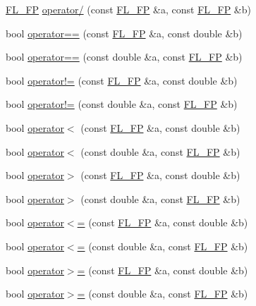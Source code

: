 \begin{DoxyCompactItemize}
\item 
\hyperlink{class_f_l___f_p}{F\+L\+\_\+\+FP} \hyperlink{class_f_l___f_p_a746b7c97a3194b33df5e6e04ce0ce5e8}{operator/} (const \hyperlink{class_f_l___f_p}{F\+L\+\_\+\+FP} \&a, const \hyperlink{class_f_l___f_p}{F\+L\+\_\+\+FP} \&b)
\item 
bool \hyperlink{class_f_l___f_p_a666442f1b900ba2e6680d77ec4261a9e}{operator==} (const \hyperlink{class_f_l___f_p}{F\+L\+\_\+\+FP} \&a, const double \&b)
\item 
bool \hyperlink{class_f_l___f_p_a8b8fd18407f83f9bbf63012179eb694d}{operator==} (const double \&a, const \hyperlink{class_f_l___f_p}{F\+L\+\_\+\+FP} \&b)
\item 
bool \hyperlink{class_f_l___f_p_a3c240fef687da52fed8f3646a924d91e}{operator!=} (const \hyperlink{class_f_l___f_p}{F\+L\+\_\+\+FP} \&a, const double \&b)
\item 
bool \hyperlink{class_f_l___f_p_a699d74159c9061491364140ac24a568b}{operator!=} (const double \&a, const \hyperlink{class_f_l___f_p}{F\+L\+\_\+\+FP} \&b)
\item 
bool \hyperlink{class_f_l___f_p_ae0d89fcb254db9759b80cca31de5ee00}{operator$<$} (const \hyperlink{class_f_l___f_p}{F\+L\+\_\+\+FP} \&a, const double \&b)
\item 
bool \hyperlink{class_f_l___f_p_af1a4354ad8a5d501c5d9f3a784ca3b95}{operator$<$} (const double \&a, const \hyperlink{class_f_l___f_p}{F\+L\+\_\+\+FP} \&b)
\item 
bool \hyperlink{class_f_l___f_p_acc2241533b3b7f53f6e8bc40c77233a5}{operator$>$} (const \hyperlink{class_f_l___f_p}{F\+L\+\_\+\+FP} \&a, const double \&b)
\item 
bool \hyperlink{class_f_l___f_p_aed84a1784274a020d95f2c01746f2b5c}{operator$>$} (const double \&a, const \hyperlink{class_f_l___f_p}{F\+L\+\_\+\+FP} \&b)
\item 
bool \hyperlink{class_f_l___f_p_a2453dc97f7fd85f4a1c07f5d888c4b87}{operator$<$=} (const \hyperlink{class_f_l___f_p}{F\+L\+\_\+\+FP} \&a, const double \&b)
\item 
bool \hyperlink{class_f_l___f_p_a78d1e2f69d82635ea82a2b717d79d5bb}{operator$<$=} (const double \&a, const \hyperlink{class_f_l___f_p}{F\+L\+\_\+\+FP} \&b)
\item 
bool \hyperlink{class_f_l___f_p_ace9ff2ae86cfecb59b601ef983b5189d}{operator$>$=} (const \hyperlink{class_f_l___f_p}{F\+L\+\_\+\+FP} \&a, const double \&b)
\item 
bool \hyperlink{class_f_l___f_p_a1f7bf9f00e36c130033949619f5261dd}{operator$>$=} (const double \&a, const \hyperlink{class_f_l___f_p}{F\+L\+\_\+\+FP} \&b)

\end{DoxyCompactItemize}
